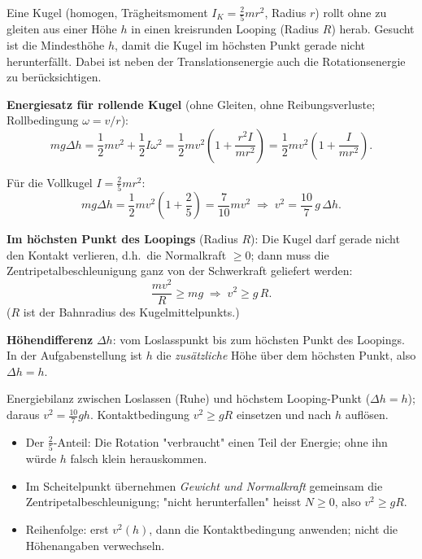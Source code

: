
Eine Kugel (homogen, Trägheitsmoment $I_K=\frac25 m r^2$, Radius $r$) rollt
ohne zu gleiten aus einer Höhe $h$ in einen kreisrunden Looping (Radius $R$)
herab. Gesucht ist die Mindesthöhe $h$, damit die Kugel im höchsten Punkt
gerade nicht herunterfällt. Dabei ist neben der Translationsenergie auch die
Rotationsenergie zu berücksichtigen.

\begin{werkzeugkasten}[Werkzeuge]
\textbf{Energiesatz für rollende Kugel} (ohne Gleiten, ohne Reibungsverluste;
Rollbedingung $\omega=v/r$):
\begin{equation}
  m g \Delta h
  = \frac12 m v^2 + \frac12 I \omega^2
  = \frac12 m v^2 \left(1+\frac{r^2 I}{m r^2}\right)
  = \frac12 m v^2\left(1+\frac{I}{m r^2}\right).
\end{equation}

Für die Vollkugel $I=\frac25 m r^2$:
\begin{equation}
  m g\Delta h = \frac12 m v^2\left(1+\frac25\right) = \frac{7}{10} m v^2
  \;\Rightarrow\;
  v^2 = \frac{10}{7}\,g\,\Delta h.
\end{equation}

\textbf{Im höchsten Punkt des Loopings} (Radius $R$): Die Kugel darf gerade
nicht den Kontakt verlieren, d.h.\ die Normalkraft $\ge 0$; dann muss die
Zentripetalbeschleunigung ganz von der Schwerkraft geliefert werden:
\begin{equation}
  \frac{m v^2}{R} \ge m g
  \;\Rightarrow\;
  v^2 \ge g\, R.
\end{equation}
($R$ ist der Bahnradius des Kugelmittelpunkts.)

\textbf{Höhendifferenz} $\Delta h$: vom Loslasspunkt bis zum höchsten Punkt
des Loopings. In der Aufgabenstellung ist $h$ die \emph{zusätzliche} Höhe
über dem höchsten Punkt, also $\Delta h=h$.
\end{werkzeugkasten}

\begin{werkzeugkasten}
Energiebilanz zwischen Loslassen (Ruhe) und höchstem Looping-Punkt
($\Delta h=h$); daraus $v^2=\frac{10}{7}gh$. Kontaktbedingung
$v^2\ge gR$ einsetzen und nach $h$ auflösen.
\end{werkzeugkasten}

\begin{achtung}
\begin{itemize}
  \item Der $\frac25$-Anteil: Die Rotation "verbraucht" einen Teil der
       Energie; ohne ihn würde $h$ falsch klein herauskommen.
  \item Im Scheitelpunkt übernehmen \emph{Gewicht und Normalkraft} gemeinsam
       die Zentripetalbeschleunigung; "nicht herunterfallen" heisst
       $N\ge0$, also $v^2\ge gR$.
  \item Reihenfolge: erst $v^2(h)$, dann die Kontaktbedingung anwenden;
       nicht die Höhenangaben verwechseln.
\end{itemize}
\end{achtung}
